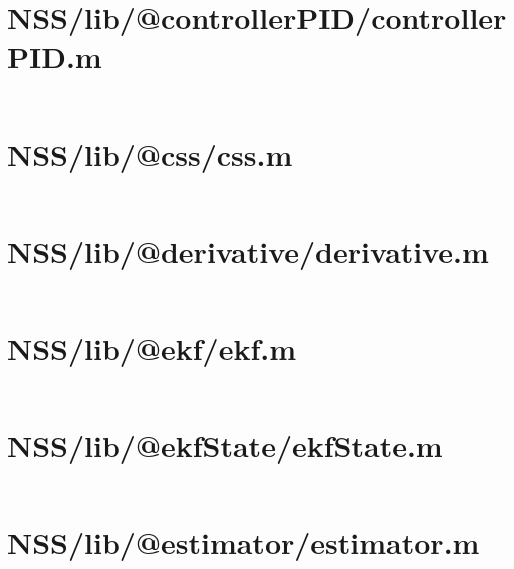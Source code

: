 \pagebreak
\section*{NSS/lib/@controllerPID/controllerPID.m}\label{code:NSS/lib/@controllerPID/controllerPID.m}
\inputminted[linenos,fontsize=\scriptsize]{matlab}{/home/dcouture/git/mathyourlife/TSatPy/beta_versions/matlab_object_oriented/lib/@controllerPID/controllerPID.m}

\pagebreak
\section*{NSS/lib/@css/css.m}\label{code:NSS/lib/@css/css.m}
\inputminted[linenos,fontsize=\scriptsize]{matlab}{/home/dcouture/git/mathyourlife/TSatPy/beta_versions/matlab_object_oriented/lib/@css/css.m}

\pagebreak
\section*{NSS/lib/@derivative/derivative.m}\label{code:NSS/lib/@derivative/derivative.m}
\inputminted[linenos,fontsize=\scriptsize]{matlab}{/home/dcouture/git/mathyourlife/TSatPy/beta_versions/matlab_object_oriented/lib/@derivative/derivative.m}

\pagebreak
\section*{NSS/lib/@ekf/ekf.m}\label{code:NSS/lib/@ekf/ekf.m}
\inputminted[linenos,fontsize=\scriptsize]{matlab}{/home/dcouture/git/mathyourlife/TSatPy/beta_versions/matlab_object_oriented/lib/@ekf/ekf.m}

\pagebreak
\section*{NSS/lib/@ekfState/ekfState.m}\label{code:NSS/lib/@ekfState/ekfState.m}
\inputminted[linenos,fontsize=\scriptsize]{matlab}{/home/dcouture/git/mathyourlife/TSatPy/beta_versions/matlab_object_oriented/lib/@ekfState/ekfState.m}

\pagebreak
\section*{NSS/lib/@estimator/estimator.m}\label{code:NSS/lib/@estimator/estimator.m}
\inputminted[linenos,fontsize=\scriptsize]{matlab}{/home/dcouture/git/mathyourlife/TSatPy/beta_versions/matlab_object_oriented/lib/@estimator/estimator.m}

